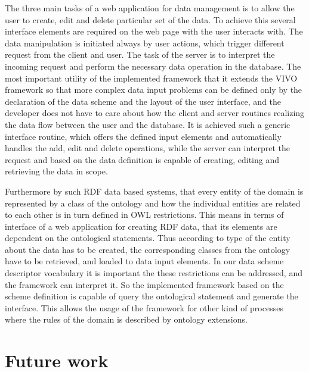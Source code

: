 The three main tasks of a web application for data management is to allow the user to create, edit and delete particular set of the data. To achieve this several interface elements are required on the web page with the user interacts with. The data manipulation is initiated always by user actions, which trigger different request from the client and user. The task of the server is to interpret the incoming request and perform the necessary data operation in the database. The most important utility of the implemented framework that it extends the VIVO framework so that more complex data input problems can be defined only by the declaration of the data scheme and the layout of the user interface, and the developer does not have to care about how the client and server routines realizing the data flow between the user and the database. It is achieved such a generic interface routine, which offers the defined input elements and automatically handles the add, edit and delete operations, while the server can interpret the request and based on the data definition is capable of creating, editing and retrieving the data in scope. 

Furthermore by such RDF data based systems, that every entity of the domain is represented by a class of the ontology and how the individual entities are related to each other is in turn defined in OWL restrictions. This means in terms of interface of a web application for creating RDF data, that its elements are dependent on the ontological statements. Thus according to type of the entity about the data has to be created, the corresponding classes from the ontology have to be retrieved, and loaded to data input elements. In our data scheme descriptor vocabulary it is important the these restrictions can be addressed, and the framework can interpret it. So the implemented framework based on the scheme definition is capable of query the ontological statement and generate the interface. This allows the usage of the framework for other kind of processes where the rules of the domain is described by ontology extensions.




\section{Future work}


